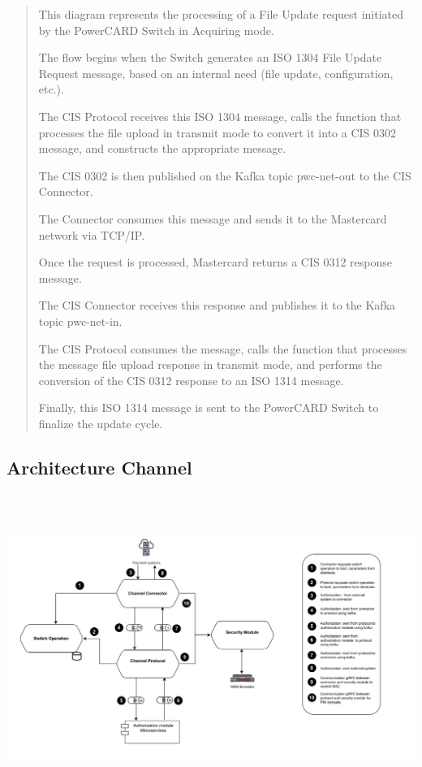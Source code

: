 \documentclass[12pt,a4paper]{report}
\begin{document}
\begin{quote}
This diagram represents the processing of a File Update request
initiated by the PowerCARD Switch in Acquiring mode.

The flow begins when the Switch generates an ISO 1304 File Update
Request message, based on an internal need (file update, configuration,
etc.).

The CIS Protocol receives this ISO 1304 message, calls the function that
processes the file upload in transmit mode to convert it into a CIS 0302
message, and constructs the appropriate message.

The CIS 0302 is then published on the Kafka topic pwc-net-out to the CIS
Connector.

The Connector consumes this message and sends it to the Mastercard
network via TCP/IP.

Once the request is processed, Mastercard returns a CIS 0312 response
message.

The CIS Connector receives this response and publishes it to the Kafka
topic pwc-net-in.

The CIS Protocol consumes the message, calls the function that processes
the message file upload response in transmit mode, and performs the
conversion of the CIS 0312 response to an ISO 1314 message.

Finally, this ISO 1314 message is sent to the PowerCARD Switch to
finalize the update cycle.
\end{quote}

\hypertarget{architecture-channel}{%
\subsection{\texorpdfstring{\textbf{Architecture
Channel}}{Architecture Channel}}\label{architecture-channel}}

\includegraphics[width=7.19457in,height=3.95867in]{vertopal_d1b0b2209edd4c6aa8254f57daa0953b/media/image50.png}
\end{document}
